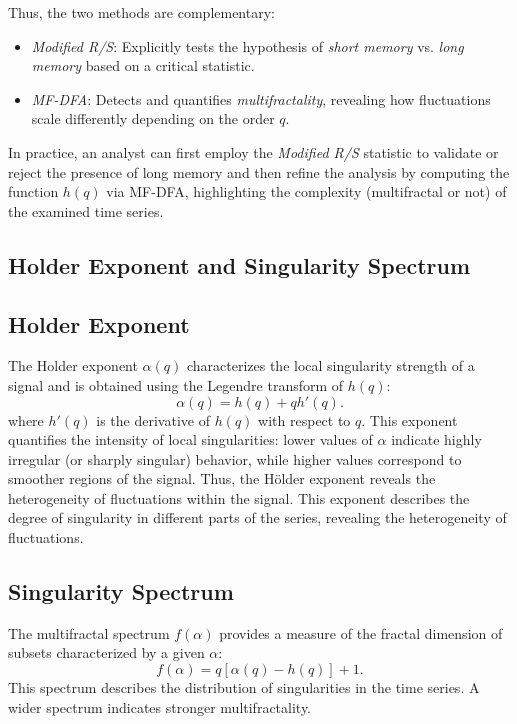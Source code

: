\documentclass[11pt]{extarticle}
\begin{document}
Thus, the two methods are complementary:

\begin{itemize}
    \item \emph{Modified R/S}: Explicitly tests the hypothesis of \emph{short memory} vs. \emph{long memory} based on a critical statistic.
    \item \emph{MF-DFA}: Detects and quantifies \emph{multifractality}, revealing how fluctuations scale differently depending on the order $q$.
\end{itemize}

In practice, an analyst can first employ the \emph{Modified R/S} statistic to validate or reject the presence of long memory and then refine the analysis by computing the function $h(q)$ via MF-DFA, highlighting the complexity (multifractal or not) of the examined time series.

\subsection{Holder Exponent and Singularity Spectrum}

\subsection{Holder Exponent}
The Holder exponent $\alpha(q)$ characterizes the local singularity strength of a signal and is obtained using the Legendre transform of $h(q)$:
\begin{equation}
\alpha(q) = h(q) + q h'(q).
\end{equation}
where $h'(q)$ is the derivative of $h(q)$ with respect to $q$. This exponent quantifies the intensity of local singularities: lower values of $\alpha$ indicate highly irregular (or sharply singular) behavior, while higher values correspond to smoother regions of the signal. Thus, the Hölder exponent reveals the heterogeneity of fluctuations within the signal.
This exponent describes the degree of singularity in different parts of the series, revealing the heterogeneity of fluctuations.

\subsection{Singularity Spectrum}
The multifractal spectrum $f(\alpha)$ provides a measure of the fractal dimension of subsets characterized by a given $\alpha$:
\begin{equation}
f(\alpha) = q [\alpha(q) - h(q)] + 1.
\end{equation}
This spectrum describes the distribution of singularities in the time series. A wider spectrum indicates stronger multifractality.
\end{document}
